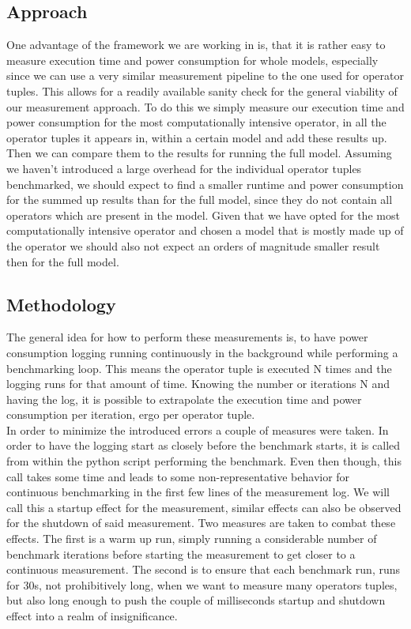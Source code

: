 \documentclass[conference]{IEEEtran}
\begin{document}
\subsection{Approach}
One advantage of the framework we are working in is, that it is rather easy to measure execution time and power consumption for whole models, especially since we can use a very similar measurement pipeline to the one used for operator tuples. This allows for a readily available sanity check for the general viability of our measurement approach. To do this we simply measure our execution time and power consumption for the most computationally intensive operator, in all the operator tuples it appears in, within a certain model and add these results up. Then we can compare them to the results for running the full model. Assuming we haven’t introduced a large overhead for the individual operator tuples benchmarked, we should expect to find a smaller runtime and power consumption for the summed up results than for the full model, since they do not contain all operators which are present in the model. Given that we have opted for the most computationally intensive operator and chosen a model that is mostly made up of the operator we should also not expect an orders of magnitude smaller result then for the full model. 

\subsection{Methodology}
The general idea for how to perform these measurements is, to have power consumption logging running continuously in the background while performing a benchmarking loop. This means the operator tuple is executed N times and the logging runs for that amount of time. Knowing the number or iterations N and having the log, it is possible to extrapolate the execution time and power consumption per iteration, ergo per operator tuple. \\
In order to minimize the introduced errors a couple of measures were taken. In order to have the logging start as closely before the benchmark starts, it is called from within the python script performing the benchmark. Even then though, this call takes some time and leads to some non-representative behavior for continuous benchmarking in the first few lines of the measurement log. We will call this a startup effect for the measurement, similar effects can also be observed for the shutdown of said measurement. Two measures are taken to combat these effects. The first is a warm up run, simply running a considerable number of benchmark iterations before starting the measurement to get closer to a continuous measurement. The second is to ensure that each benchmark run, runs for 30s, not prohibitively long, when we want to measure many operators tuples, but also long enough to push the couple of milliseconds startup and shutdown effect into a realm of insignificance.
\end{document}
